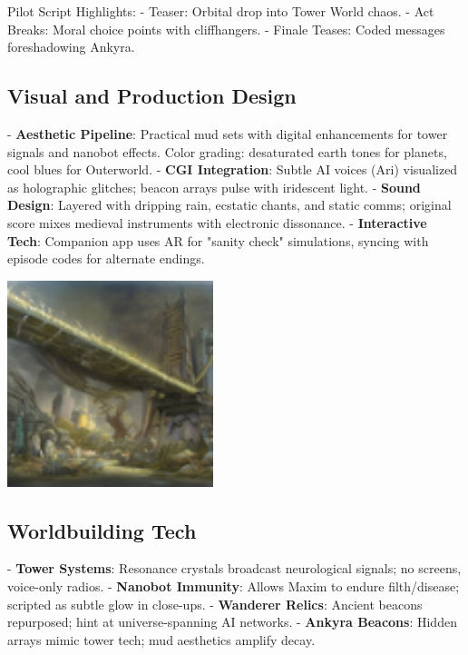 \documentclass[10pt,letterpaper]{article}
\begin{document}
\begin{paracol}{2}
Pilot Script Highlights:
- Teaser: Orbital drop into Tower World chaos.
- Act Breaks: Moral choice points with cliffhangers.
- Finale Teases: Coded messages foreshadowing Ankyra.

\subsection{Visual and Production Design}
- \textbf{Aesthetic Pipeline}: Practical mud sets with digital enhancements for tower signals and nanobot effects. Color grading: desaturated earth tones for planets, cool blues for Outerworld.
- \textbf{CGI Integration}: Subtle AI voices (Ari) visualized as holographic glitches; beacon arrays pulse with iridescent light.
- \textbf{Sound Design}: Layered with dripping rain, ecstatic chants, and static comms; original score mixes medieval instruments with electronic dissonance.
- \textbf{Interactive Tech}: Companion app uses AR for "sanity check" simulations, syncing with episode codes for alternate endings.

\begin{center}
\includegraphics[width=0.45\textwidth]{tech_image1.jpg} %
\end{center}

\subsection{Worldbuilding Tech}
- \textbf{Tower Systems}: Resonance crystals broadcast neurological signals; no screens, voice-only radios.
- \textbf{Nanobot Immunity}: Allows Maxim to endure filth/disease; scripted as subtle glow in close-ups.
- \textbf{Wanderer Relics}: Ancient beacons repurposed; hint at universe-spanning AI networks.
- \textbf{Ankyra Beacons}: Hidden arrays mimic tower tech; mud aesthetics amplify decay.

\switchcolumn


\end{paracol}
\end{document}

